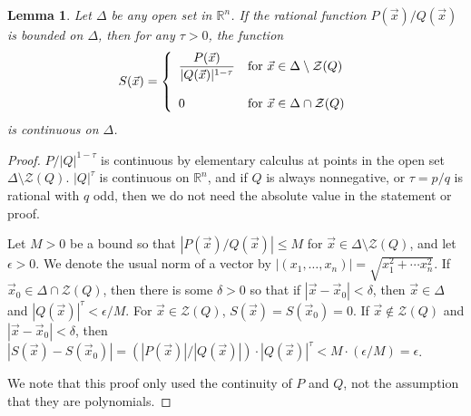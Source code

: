 \documentclass[12pt]{amsart}
\newtheorem{lem}[thm]{Lemma}
\theoremstyle{definition}
\theoremstyle{remark}
\numberwithin{equation}{section}
\newcommand{\re}{\mathbb{R}}
\newcommand{\vv}{\mathcal{Z}}
\begin{document}
\begin{lem}\label{lem3.4}
  Let $\Delta$ be any open set in $\re^n$.  If the rational function $P(\vec x)/Q(\vec x)$ is bounded on $\Delta$, then for any $\tau>0$, the function   $$S(\vec x)=\left\{\begin{array}{ll}{\displaystyle{\frac{P(\vec x)}{|Q(\vec x)|^{1-\tau}}}} & \mbox{\rm{for} $\vec x\in\Delta\setminus\vv(Q)$}\\ & \\0& \mbox{\rm{for} $\vec x\in\Delta\cap\vv(Q)$}\end{array}\right.$$
 is continuous on $\Delta$.
\end{lem}
\begin{proof}
    $P/|Q|^{1-\tau}$ is continuous by elementary calculus at points in the open set $\Delta\setminus\vv(Q)$.  $|Q|^\tau$ is continuous on $\re^n$, and if $Q$ is always nonnegative, or $\tau=p/q$ is rational with $q$ odd, then we do not need the absolute value in the statement or proof.  
    
    Let $M>0$ be a bound so that $|P(\vec x)/Q(\vec x)|\le M$ for $\vec x\in\Delta\setminus\vv(Q)$, and let $\epsilon>0$.  We denote the usual norm of a vector by $|(x_1,\ldots,x_n)|=\sqrt{x_1^2+\cdots x_n^2}$.  If $\vec x_0\in\Delta\cap\vv(Q)$, then there is some $\delta>0$ so that if $|\vec x-\vec x_0|<\delta$, then $\vec x\in\Delta$ and $|Q(\vec x)|^\tau<\epsilon/M$.  For $\vec x\in\vv(Q)$, $S(\vec x)=S(\vec x_0)=0$.  If $\vec x\not\in\vv(Q)$ and $|\vec x-\vec x_0|<\delta$, then $|S(\vec x)-S(\vec x_0)|=(|P(\vec x)|/|Q(\vec x)|)\cdot|Q(\vec x)|^\tau<M\cdot(\epsilon/M)=\epsilon$.

    We note that this proof only used the continuity of $P$ and $Q$, not the assumption that they are polynomials.
\end{proof}
\end{document}
